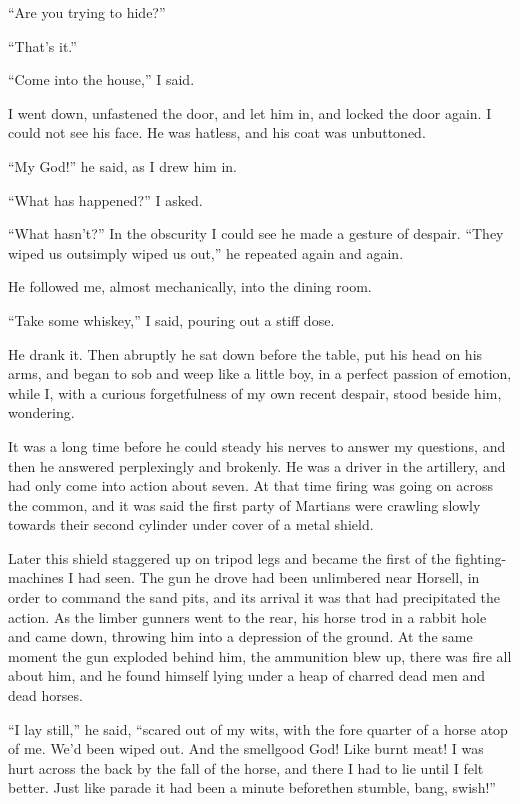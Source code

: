 ``Are you trying to hide?''

``That's it.''

``Come into the house,'' I said.

I went down, unfastened the door, and let him in, and locked the
door again. I could not see his face. He was hatless, and his coat
was unbuttoned.

``My God!'' he said, as I drew him in.

``What has happened?'' I asked.

``What hasn't?'' In the obscurity I could see he made a gesture of
despair. ``They wiped us out\dash{}simply wiped us out,'' he repeated
again and again.

He followed me, almost mechanically, into the dining room.

``Take some whiskey,'' I said, pouring out a stiff dose.

He drank it. Then abruptly he sat down before the table, put his
head on his arms, and began to sob and weep like a little boy, in a
perfect passion of emotion, while I, with a curious forgetfulness
of my own recent despair, stood beside him, wondering.

It was a long time before he could steady his nerves to answer my
questions, and then he answered perplexingly and brokenly. He was a
driver in the artillery, and had only come into action about seven.
At that time firing was going on across the common, and it was said
the first party of Martians were crawling slowly towards their
second cylinder under cover of a metal shield.

Later this shield staggered up on tripod legs and became the first
of the fighting-machines I had seen. The gun he drove had been
unlimbered near Horsell, in order to command the sand pits, and its
arrival it was that had precipitated the action. As the limber
gunners went to the rear, his horse trod in a rabbit hole and came
down, throwing him into a depression of the ground. At the same
moment the gun exploded behind him, the ammunition blew up, there
was fire all about him, and he found himself lying under a heap of
charred dead men and dead horses.

``I lay still,'' he said, ``scared out of my wits, with the fore
quarter of a horse atop of me. We'd been wiped out. And the
smell\dash{}good God! Like burnt meat! I was hurt across the back by the
fall of the horse, and there I had to lie until I felt better. Just
like parade it had been a minute before\dash{}then stumble, bang,
swish!''

